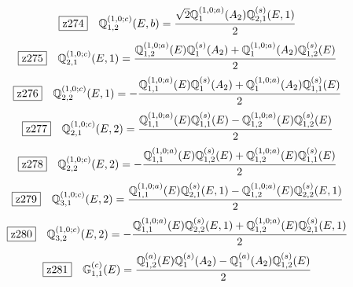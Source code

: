 \documentclass[fleqn,10pt,landscape]{jsarticle}
\begin{document}
\begin{dmath*}
\hspace*{3mm}\fbox{z274}\quad \mathbb{Q}_{1,2}^{(1,0;c)}(E,b)=\frac{\sqrt{2} \mathbb{Q}_{1}^{(1,0;a)}(A_{2}) \mathbb{Q}_{2,1}^{(s)}(E,1)}{2}
\end{dmath*}
\begin{dmath*}
\hspace*{3mm}\fbox{z275}\quad \mathbb{Q}_{2,1}^{(1,0;c)}(E,1)=\frac{\mathbb{Q}_{1,2}^{(1,0;a)}(E) \mathbb{Q}_{1}^{(s)}(A_{2}) + \mathbb{Q}_{1}^{(1,0;a)}(A_{2}) \mathbb{Q}_{1,2}^{(s)}(E)}{2}
\end{dmath*}
\begin{dmath*}
\hspace*{3mm}\fbox{z276}\quad \mathbb{Q}_{2,2}^{(1,0;c)}(E,1)=- \frac{\mathbb{Q}_{1,1}^{(1,0;a)}(E) \mathbb{Q}_{1}^{(s)}(A_{2}) + \mathbb{Q}_{1}^{(1,0;a)}(A_{2}) \mathbb{Q}_{1,1}^{(s)}(E)}{2}
\end{dmath*}
\begin{dmath*}
\hspace*{3mm}\fbox{z277}\quad \mathbb{Q}_{2,1}^{(1,0;c)}(E,2)=\frac{\mathbb{Q}_{1,1}^{(1,0;a)}(E) \mathbb{Q}_{1,1}^{(s)}(E) - \mathbb{Q}_{1,2}^{(1,0;a)}(E) \mathbb{Q}_{1,2}^{(s)}(E)}{2}
\end{dmath*}
\begin{dmath*}
\hspace*{3mm}\fbox{z278}\quad \mathbb{Q}_{2,2}^{(1,0;c)}(E,2)=- \frac{\mathbb{Q}_{1,1}^{(1,0;a)}(E) \mathbb{Q}_{1,2}^{(s)}(E) + \mathbb{Q}_{1,2}^{(1,0;a)}(E) \mathbb{Q}_{1,1}^{(s)}(E)}{2}
\end{dmath*}
\begin{dmath*}
\hspace*{3mm}\fbox{z279}\quad \mathbb{Q}_{3,1}^{(1,0;c)}(E,2)=\frac{\mathbb{Q}_{1,1}^{(1,0;a)}(E) \mathbb{Q}_{2,1}^{(s)}(E,1) - \mathbb{Q}_{1,2}^{(1,0;a)}(E) \mathbb{Q}_{2,2}^{(s)}(E,1)}{2}
\end{dmath*}
\begin{dmath*}
\hspace*{3mm}\fbox{z280}\quad \mathbb{Q}_{3,2}^{(1,0;c)}(E,2)=- \frac{\mathbb{Q}_{1,1}^{(1,0;a)}(E) \mathbb{Q}_{2,2}^{(s)}(E,1) + \mathbb{Q}_{1,2}^{(1,0;a)}(E) \mathbb{Q}_{2,1}^{(s)}(E,1)}{2}
\end{dmath*}
\begin{dmath*}
\hspace*{3mm}\fbox{z281}\quad \mathbb{G}_{1,1}^{(c)}(E)=\frac{\mathbb{Q}_{1,2}^{(a)}(E) \mathbb{Q}_{1}^{(s)}(A_{2}) - \mathbb{Q}_{1}^{(a)}(A_{2}) \mathbb{Q}_{1,2}^{(s)}(E)}{2}
\end{dmath*}
\end{document}
